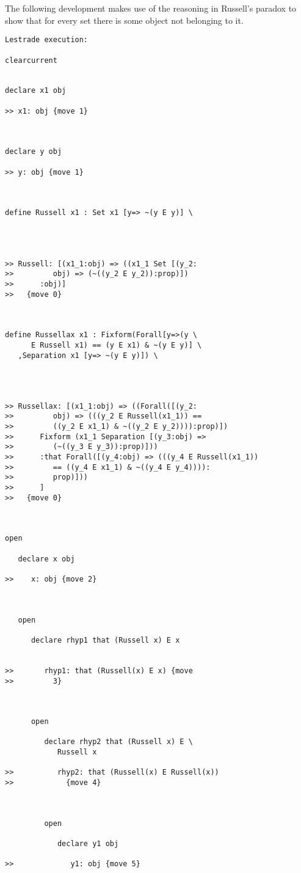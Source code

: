 \documentclass[12pt]{article}
\begin{document}
The following development makes use of the reasoning in Russell's paradox to show that for every set there is some object not belonging to it.

\begin{verbatim}Lestrade execution:

clearcurrent


declare x1 obj

>> x1: obj {move 1}



declare y obj

>> y: obj {move 1}



define Russell x1 : Set x1 [y=> ~(y E y)] \
   



>> Russell: [(x1_1:obj) => ((x1_1 Set [(y_2:
>>         obj) => (~((y_2 E y_2)):prop)])
>>      :obj)]
>>   {move 0}



define Russellax x1 : Fixform(Forall[y=>(y \
      E Russell x1) == (y E x1) & ~(y E y)] \
   ,Separation x1 [y=> ~(y E y)]) \
   



>> Russellax: [(x1_1:obj) => ((Forall([(y_2:
>>         obj) => (((y_2 E Russell(x1_1)) ==
>>         ((y_2 E x1_1) & ~((y_2 E y_2)))):prop)])
>>      Fixform (x1_1 Separation [(y_3:obj) =>
>>         (~((y_3 E y_3)):prop)]))
>>      :that Forall([(y_4:obj) => (((y_4 E Russell(x1_1))
>>         == ((y_4 E x1_1) & ~((y_4 E y_4)))):
>>         prop)]))
>>      ]
>>   {move 0}



open

   declare x obj

>>    x: obj {move 2}



   open

      declare rhyp1 that (Russell x) E x


>>       rhyp1: that (Russell(x) E x) {move
>>         3}



      open

         declare rhyp2 that (Russell x) E \
            Russell x

>>          rhyp2: that (Russell(x) E Russell(x))
>>            {move 4}



         open

            declare y1 obj

>>             y1: obj {move 5}




\end{verbatim}
\end{document}
